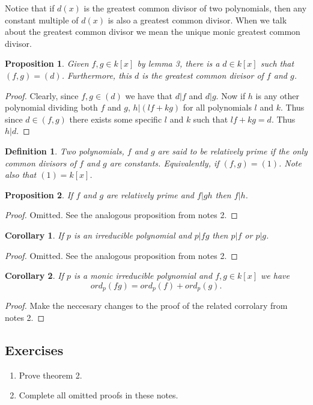 \documentclass{article}
\theoremstyle{problemstyle}
\newtheorem{proposition}{Proposition}
\newtheorem{corollary}{Corollary}
\newtheorem{definition}{Definition}
\begin{document}
Notice that if $d(x)$ is the greatest common divisor of two polynomials, then any constant multiple of $d(x)$ is also a greatest common divisor. When we talk about the greatest common divisor we mean the unique monic greatest common divisor. 

\begin{proposition}
Given $f,g \in k[x]$ by lemma 3, there is a $d \in k[x]$ such that $(f,g) = (d)$. Furthermore, this $d$ is the greatest common divisor of $f$ and $g$. 
\end{proposition}

\begin{proof}
Clearly, since $f,g \in (d)$ we have that $d|f$ and $d|g$. Now if $h$ is any other polynomial dividing both $f$ and $g$, $h|(lf+kg)$ for all polynomials $l$ and $k$. Thus since $d \in (f,g)$ there exists some specific $l$ and $k$ such that $lf+kg = d$. Thus $h|d$. 
\end{proof}

\begin{definition}
Two polynomials, $f$ and $g$ are said to be relatively prime if the only common divisors of $f$ and $g$ are constants. Equivalently, if $(f,g) = (1)$. Note also that $(1) = k[x]$. 
\end{definition}

\begin{proposition}
If $f$ and $g$ are relatively prime and $f|gh$ then $f|h$. 
\end{proposition}

\begin{proof}
Omitted. See the analogous proposition from notes 2. 
\end{proof}

\begin{corollary}
If $p$ is an irreducible polynomial and $p|fg$ then $p|f$ or $p|g$. 
\end{corollary}

\begin{proof}
Omitted. See the analogous proposition from notes 2. 
\end{proof}

\begin{corollary}
If $p$ is a monic irreducible polynomial and $f,g\in k[x]$ we have $$ord_p(fg) = ord_p(f)+ord_p(g).$$
\end{corollary}

\begin{proof}
Make the neccesary changes to the proof of the related corrolary from notes 2. 
\end{proof}

\subsection*{Exercises}
\begin{enumerate}
\item Prove theorem 2. 
\item Complete all omitted proofs in these notes. 

\end{enumerate}
\end{document}
